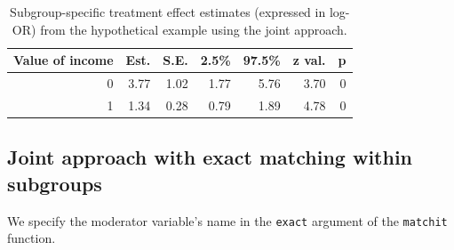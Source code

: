 \documentclass[
  letterpaper,
  DIV=11,
  numbers=noendperiod]{scrreprt}
\begin{document}
\hypertarget{tbl-joint-approach}{}
\begin{table}[!h]
\caption{\label{tbl-joint-approach}Subgroup-specific treatment effect estimates (expressed in log-OR) from
the hypothetical example using the joint approach. }\tabularnewline

\centering
\begin{tabular}{r|r|r|r|r|r|r}
\hline
Value of income & Est. & S.E. & 2.5\% & 97.5\% & z val. & p\\
\hline
0 & 3.77 & 1.02 & 1.77 & 5.76 & 3.70 & 0\\
\hline
1 & 1.34 & 0.28 & 0.79 & 1.89 & 4.78 & 0\\
\hline
\end{tabular}
\end{table}

\hypertarget{joint-approach-with-exact-matching-within-subgroups}{%
\subsection{Joint approach with exact matching within
subgroups}\label{joint-approach-with-exact-matching-within-subgroups}}

We specify the moderator variable's name in the \texttt{exact} argument
of the \texttt{matchit} function.
\end{document}
